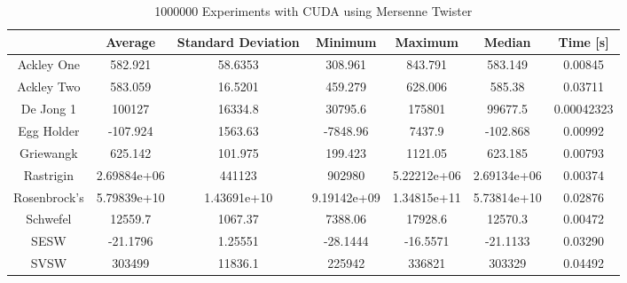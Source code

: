 \documentclass{article}
\begin{document}
        \begin{table}[h]
            \begin{centering}
                \begin{tabular}{|c||c|c|c|c|c|c|}
                    \hline
                                & Average & Standard Deviation & Minimum & Maximum & Median & Time [s] \\
                    \hline
                    \hline
                    Ackley One & 582.921 & 58.6353 & 308.961 & 843.791 & 583.149 & 0.00845 \\
                    \hline
                    Ackley Two & 583.059 & 16.5201 & 459.279 & 628.006 & 585.38 & 0.03711 \\
                    \hline
                    De Jong 1 & 100127 & 16334.8 & 30795.6 & 175801 & 99677.5 & 0.00042323\\
                    \hline
                    Egg Holder & -107.924 & 1563.63 & -7848.96 & 7437.9 & -102.868 & 0.00992 \\
                    \hline
                    Griewangk & 625.142 & 101.975 & 199.423 & 1121.05 & 623.185 & 0.00793 \\
                    \hline
                    Rastrigin & 2.69884e+06 & 441123 & 902980 & 5.22212e+06 & 2.69134e+06 & 0.00374 \\
                    \hline
                    Rosenbrock's & 5.79839e+10 & 1.43691e+10 & 9.19142e+09 & 1.34815e+11 & 5.73814e+10 & 0.02876 \\
                    \hline
                    Schwefel & 12559.7 & 1067.37 & 7388.06 & 17928.6 & 12570.3 & 0.00472\\
                    \hline
                    SESW & -21.1796 & 1.25551 & -28.1444 & -16.5571 & -21.1133 & 0.03290 \\
                    \hline
                    SVSW & 303499 & 11836.1 & 225942 & 336821 & 303329 & 0.04492 \\
                    \hline
                \end{tabular}
                \caption{1000000 Experiments with CUDA using Mersenne Twister}
            \end{centering}
            \end{table}
\end{document}
